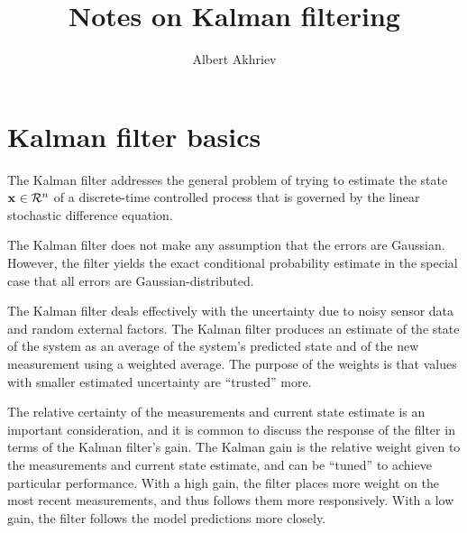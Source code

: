 \documentclass[]{article}
\title{Notes on Kalman filtering}
\author{Albert Akhriev}
\begin{document}
\maketitle


\newcommand{\myx}[1]{{{\bf x}_{#1}}}
\newcommand{\myu}[1]{{{\bf u}_{#1}}}
\newcommand{\myw}[1]{{{\bf w}_{#1}}}
\newcommand{\myv}[1]{{{\bf v}_{#1}}}
\newcommand{\myy}[1]{{{\bf y}_{#1}}}
\newcommand{\myz}[1]{{{\bf z}_{#1}}}
\newcommand{\myA}[1]{{{\bf A}_{#1}}}
\newcommand{\myAt}[1]{{{\bf A}_{#1}^T}}
\newcommand{\myB}[1]{{{\bf B}_{#1}}}
\newcommand{\myH}[1]{{{\bf H}_{#1}}}
\newcommand{\myHt}[1]{{{\bf H}_{#1}^T}}
\newcommand{\myK}[1]{{{\bf K}_{#1}}}
\newcommand{\myQ}[1]{{{\bf Q}_{#1}}}
\newcommand{\myP}[1]{{{\bf P}_{#1}}}
\newcommand{\myR}[1]{{{\bf R}_{#1}}}
\newcommand{\myS}[1]{{{\bf S}_{#1}}}
\newcommand{\xest}[1]{{{\hat{\bf x}}_{#1}}}

\section{Kalman filter basics}

The Kalman filter addresses the general problem of trying to estimate the state $\myx{} \in {\cal R}^n$ of a discrete-time controlled process that is governed by the linear stochastic difference equation.

The Kalman filter does not make any assumption that the errors are Gaussian. However, the filter yields the exact conditional probability estimate in the special case that all errors are Gaussian-distributed.

The Kalman filter deals effectively with the uncertainty due to noisy sensor data and random external factors. The Kalman filter produces an estimate of the state of the system as an average of the system's predicted state and of the new measurement using a weighted average. The purpose of the weights is that values with smaller estimated uncertainty are ``trusted'' more. 

The relative certainty of the measurements and current state estimate is an important consideration, and it is common to discuss the response of the filter in terms of the Kalman filter's gain. The Kalman gain is the relative weight given to the measurements and current state estimate, and can be ``tuned'' to achieve particular performance. With a high gain, the filter places more weight on the most recent measurements, and thus follows them more responsively. With a low gain, the filter follows the model predictions more closely.
\end{document}
